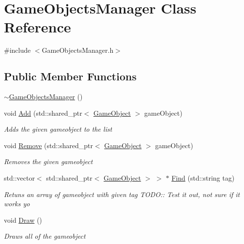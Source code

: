 \hypertarget{class_game_objects_manager}{}\section{Game\+Objects\+Manager Class Reference}
\label{class_game_objects_manager}


{\ttfamily \#include $<$Game\+Objects\+Manager.\+h$>$}

\subsection*{Public Member Functions}
\begin{DoxyCompactItemize}
\item 
\mbox{\hyperlink{class_game_objects_manager_abe5aece84355a01f2473b41217f28026}{$\sim$\+Game\+Objects\+Manager}} ()
\item 
void \mbox{\hyperlink{class_game_objects_manager_a20480f2dbcb4607aa74c75e6f4ddccdb}{Add}} (std\+::shared\+\_\+ptr$<$ \mbox{\hyperlink{class_game_object}{Game\+Object}} $>$ game\+Object)
\begin{DoxyCompactList}\small\item\em Adds the given gameobject to the list \end{DoxyCompactList}\item 
void \mbox{\hyperlink{class_game_objects_manager_a1aff7fa8c420de210baffadf2e2be703}{Remove}} (std\+::shared\+\_\+ptr$<$ \mbox{\hyperlink{class_game_object}{Game\+Object}} $>$ game\+Object)
\begin{DoxyCompactList}\small\item\em Removes the given gameobject \end{DoxyCompactList}\item 
std\+::vector$<$ std\+::shared\+\_\+ptr$<$ \mbox{\hyperlink{class_game_object}{Game\+Object}} $>$ $>$ $\ast$ \mbox{\hyperlink{class_game_objects_manager_a0f2728da34f1a966f2b7aa9a35f8e614}{Find}} (std\+::string tag)
\begin{DoxyCompactList}\small\item\em Retuns an array of gameobject with given tag T\+O\+DO\+:\+: Test it out, not sure if it works yo \end{DoxyCompactList}\item 
void \mbox{\hyperlink{class_game_objects_manager_a60c1378f98fbef5dc98c8fdd094ef3c9}{Draw}} ()
\begin{DoxyCompactList}\small\item\em Draws all of the gameobject \end{DoxyCompactList}\item 

\end{DoxyCompactItemize}
